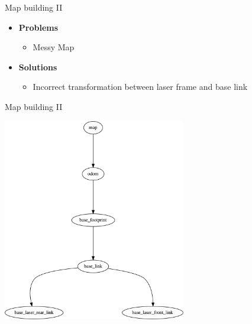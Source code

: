 \begin{frame}{Map building II}
\begin{itemize}
	\item \textbf{Problems}
		\begin{itemize}
			\item Messy Map
		\end{itemize}
	\item \textbf{Solutions}
		\begin{itemize}
			\item Incorrect transformation between laser frame and base link
		\end{itemize}
\end{itemize}
\end{frame}
\begin{frame}{Map building II}
    \begin{center}
    \includegraphics[width=0.6\textwidth]{gfx/frames_cleaned.pdf}
    \end{center}
\end{frame}
